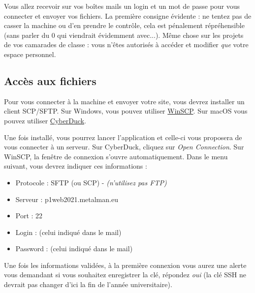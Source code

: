 


\noindent Vous allez recevoir sur vos boîtes mails un login et un mot de passe pour vous connecter et envoyer vos fichiers.
La première consigne évidente : ne tentez pas de casser la machine ou d'en prendre le contrôle, cela est pénalement répréhensible (sans parler du 0 qui viendrait évidemment avec...).
Même chose sur les projets de vos camarades de classe : vous n'êtes autorisés à accéder et modifier \textit{que} votre espace personnel.

\bigskip

\subsection{Accès aux fichiers}

\noindent Pour vous connecter à la machine et envoyer votre site, vous devrez installer un client SCP/SFTP.
Sur Windows, vous pouvez utiliser \href{https://winscp.net}{WinSCP}.
Sur macOS vous pouvez utiliser \href{https://cyberduck.io}{CyberDuck}.

\bigskip

\noindent Une fois installé, vous pourrez lancer l'application et celle-ci vous proposera de vous connecter à un serveur.
Sur CyberDuck, cliquez sur \textit{Open Connection}.
Sur WinSCP, la fenêtre de connexion s'ouvre automatiquement.
Dans le menu suivant, vous devrez indiquer ces informations :

\bigskip

\begin{itemize}
\item Protocole : SFTP (ou SCP) - \textit{(n'utilisez pas FTP)}
\item Serveur : p1web2021.metalman.eu
\item Port : 22
\item Login : (celui indiqué dans le mail)
\item Password : (celui indiqué dans le mail)
\end{itemize}

\bigskip

\noindent Une fois les informations validées, à la première connexion vous aurez une alerte vous demandant si vous souhaitez enregistrer la clé, répondez \textit{oui} (la clé SSH ne devrait pas changer d'ici la fin de l'année universitaire).


